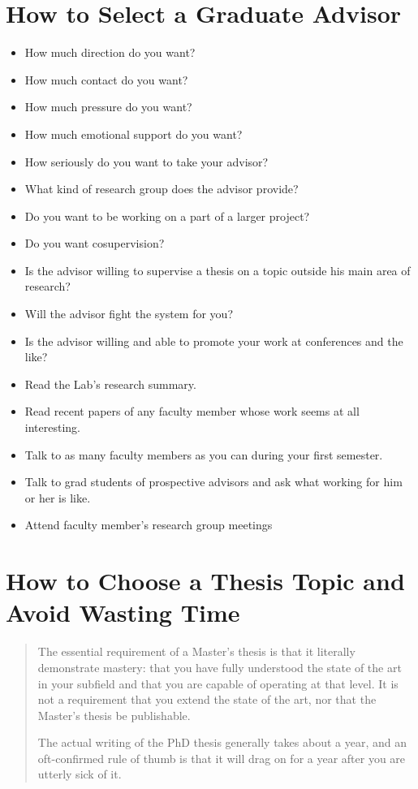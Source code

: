 \section{How to Select a Graduate Advisor}
\begin{itemize}
\item How much direction do you want? 
\item How much contact do you want? 
\item How much pressure do you want? 
\item How much emotional support do you want? 
\item How seriously do you want to take your advisor? 
\item What kind of research group does the advisor provide? 
\item Do you want to be working on a part of a larger project? 
\item Do you want cosupervision? 
\item Is the advisor willing to supervise a thesis on a topic outside his main area of research? 
\item Will the advisor fight the system for you? 
\item Is the advisor willing and able to promote your work at conferences and the like? 
\end{itemize}


\begin{itemize}
\item Read the Lab’s research summary. 
\item Read recent papers of any faculty member whose work seems at all interesting.
\item Talk to as many faculty members as you can during your first semester.
\item Talk to grad students of prospective advisors and ask what working for him or her is like. 
\item Attend faculty member's research group meetings
\end{itemize}

\section{How to Choose a Thesis Topic and Avoid Wasting Time}
\blockquote{The essential requirement of a Master’s thesis is that it literally
demonstrate mastery: that you have fully understood the state of the art in your
subfield and that you are capable of operating at that level. It is not a
requirement that you extend the state of the art, nor that the Master’s thesis
be publishable.

The actual writing of the PhD thesis generally takes about a year, and an
oft-confirmed rule of thumb is that it will drag on for a year after you are
utterly sick of it.
}

